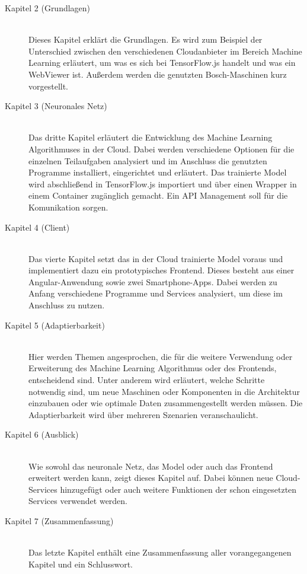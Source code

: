 \begin{description}

    \item[Kapitel 2 (Grundlagen)]\hfill \\
    Dieses Kapitel erklärt die Grundlagen. Es wird zum Beispiel der Unterschied zwischen den verschiedenen Cloudanbieter
    im Bereich Machine Learning erläutert, um was es sich bei TensorFlow.js handelt und was ein WebViewer ist. Außerdem
    werden die genutzten Bosch-Maschinen kurz vorgestellt.

    \item[Kapitel 3 (Neuronales Netz)]\hfill \\
    Das dritte Kapitel erläutert die Entwicklung des Machine Learning Algorithmuses in der Cloud. Dabei werden
    verschiedene Optionen für die einzelnen Teilaufgaben analysiert und im Anschluss die genutzten Programme installiert,
    eingerichtet und erläutert. Das trainierte Model wird abschließend in TensorFlow.js importiert und über einen Wrapper
    in einem Container zugänglich gemacht. Ein API Management soll für die Komunikation sorgen.

    \item[Kapitel 4 (Client)]\hfill \\
    Das vierte Kapitel setzt das in der Cloud trainierte Model voraus und implementiert dazu ein prototypisches Frontend.
    Dieses besteht aus einer Angular-Anwendung sowie zwei Smartphone-Apps. Dabei werden zu Anfang verschiedene Programme
    und Services analysiert, um diese im Anschluss zu nutzen.

    \item[Kapitel 5 (Adaptierbarkeit)]\hfill \\
    Hier werden Themen angesprochen, die für die weitere Verwendung oder Erweiterung des Machine Learning Algorithmus
    oder des Frontends, entscheidend sind. Unter anderem wird erläutert, welche Schritte notwendig sind, um neue
    Maschinen oder Komponenten in die Architektur einzubauen oder wie optimale Daten zusammengestellt werden müssen. Die
    Adaptierbarkeit wird über mehreren Szenarien veranschaulicht.

    \item[Kapitel 6 (Ausblick)]\hfill \\
    Wie sowohl das neuronale Netz, das Model oder auch das Frontend erweitert werden kann, zeigt dieses Kapitel auf.
    Dabei können neue Cloud-Services hinzugefügt oder auch weitere Funktionen der schon eingesetzten Services verwendet
    werden.

    \item[Kapitel 7 (Zusammenfassung)]\hfill \\
    Das letzte Kapitel enthält eine Zusammenfassung aller vorangegangenen Kapitel und ein Schlusswort.

\end{description}